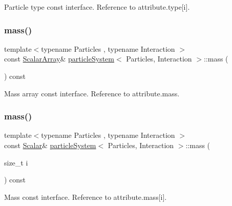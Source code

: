Particle type const interface. Reference to attribute.\+type\mbox{[}i\mbox{]}. 

\mbox{\label{classparticle_system_a8adc16a716e231f9840dd7f7e063f656}} 
\subsubsection{\texorpdfstring{mass()}{mass()}\hspace{0.1cm}{\footnotesize\ttfamily [1/2]}}
{\footnotesize\ttfamily template$<$typename Particles , typename Interaction $>$ \\
const \mbox{\hyperlink{classparticle_system_a7f143d2466bd0f78d79cccd3493a756b}{Scalar\+Array}}\& \mbox{\hyperlink{classparticle_system}{particle\+System}}$<$ Particles, Interaction $>$\+::mass (\begin{DoxyParamCaption}{ }\end{DoxyParamCaption}) const\hspace{0.3cm}{\ttfamily [inline]}}



Mass array const interface. Reference to attribute.\+mass. 

\mbox{\label{classparticle_system_a1bbc12a8ac1923956f409e6f66cdc12d}} 
\subsubsection{\texorpdfstring{mass()}{mass()}\hspace{0.1cm}{\footnotesize\ttfamily [2/2]}}
{\footnotesize\ttfamily template$<$typename Particles , typename Interaction $>$ \\
const \mbox{\hyperlink{classparticle_system_a3938954186247e3eab01cc75fcc62b40}{Scalar}}\& \mbox{\hyperlink{classparticle_system}{particle\+System}}$<$ Particles, Interaction $>$\+::mass (\begin{DoxyParamCaption}\item[{size\+\_\+t}]{i }\end{DoxyParamCaption}) const\hspace{0.3cm}{\ttfamily [inline]}}



Mass const interface. Reference to attribute.\+mass\mbox{[}i\mbox{]}. 

